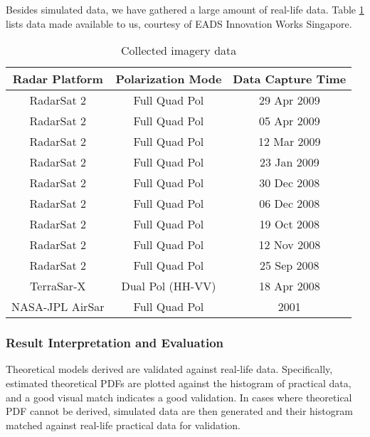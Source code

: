 Besides simulated  data, we have gathered a large amount of real-life data.
Table \ref{tbl:collected_data} lists data made available to us, courtesy of EADS Innovation Works Singapore. 

\begin{table}
\centering
\begin{tabular}{|c|c|c|}
\hline
Radar Platform & Polarization Mode & Data Capture Time \\
\hline
RadarSat 2 & Full Quad Pol & 29 Apr 2009 \\
RadarSat 2 & Full Quad Pol & 05 Apr 2009 \\
RadarSat 2 & Full Quad Pol & 12 Mar 2009 \\
RadarSat 2 & Full Quad Pol & 23 Jan 2009 \\
RadarSat 2 & Full Quad Pol & 30 Dec 2008 \\
RadarSat 2 & Full Quad Pol & 06 Dec 2008 \\
RadarSat 2 & Full Quad Pol & 19 Oct 2008 \\
RadarSat 2 & Full Quad Pol & 12 Nov 2008 \\
RadarSat 2 & Full Quad Pol & 25 Sep 2008 \\
TerraSar-X & Dual Pol (HH-VV) & 18 Apr 2008 \\
NASA-JPL AirSar & Full Quad Pol & 2001 \\
\hline
\end{tabular}

\label{tbl:collected_data}
\caption{Collected imagery data}
\end{table}

\subsubsection{Result Interpretation and Evaluation}

Theoretical models derived are validated against real-life data.
Specifically, estimated theoretical PDFs are plotted against the histogram of practical data, and a good visual match indicates a good validation.
In cases where theoretical PDF cannot be derived, simulated data are then generated and their histogram matched against real-life practical data for validation.


